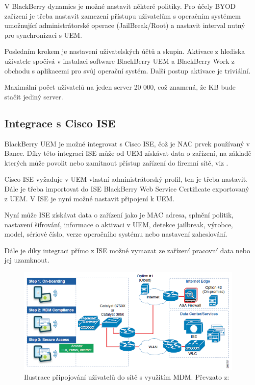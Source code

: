 V BlackBerry dynamics je možné nastavit některé politiky. Pro účely BYOD zařízení je třeba nastavit zamezení přístupu uživatelům s operačním systémem umožnující administrátorské operace (JailBreak/Root) a nastavit interval nutný pro synchronizaci s UEM.

Posledním krokem je nastavení uživatelských účtů a skupin. Aktivace z hlediska uživatele spočívá v instalaci software BlackBerry UEM a BlackBerry Work z obchodu s aplikacemi pro svůj operační systém. Další postup aktivace je triviální.

Maximální počet uživatelů na jeden server 20 000, což znamená, že KB bude stačit jediný server. 

\subsection{Integrace s Cisco ISE}

BlackBerry UEM je možné integrovat s Cisco ISE, čož je NAC prvek používaný v Bance. Díky této integraci ISE může od UEM získávat data o zařízení, na základě kterých může povolit nebo zamítnout přístup zařízení do firemní sítě, viz \cite{CiscoDesign}.

Cisco ISE vyžaduje v UEM vlastní administrátorský profil, ten je třeba nastavit. Dále je třeba importovat do ISE BlackBerry Web Service Certificate exportovaný z UEM. V ISE je nyní možné nastavit připojení k UEM. 

Nyní může ISE získávat data o zařízení jako je MAC adresa, splnění politik, nastavení šifrování, informace o aktivaci v UEM, detekce jailbreak, výrobce, model, sériové číslo, verze operačního systému nebo nastavení zaheslování.

Dále je díky integraci přímo z ISE možné vymazat ze zařízení pracovní data nebo jej uzamknout.

\begin{figure}[h!]
\centering
\includegraphics[width=13cm]{img/CiscoMDM}
\caption{Ilustrace připojování uživatelů do sítě s využitím MDM. Převzato z: \cite{CiscoDesign}\label{CiscoMDM}}
\end{figure}%

